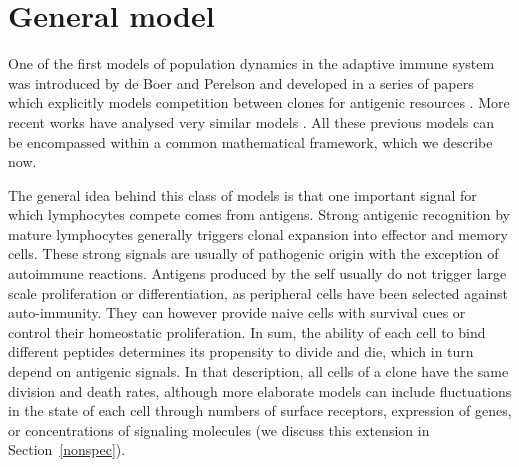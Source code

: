 \documentclass[aps,pre,twocolumn,superscriptaddress,groupedaddress]{revtex4}
\newcommand{\<}{\langle}
\renewcommand{\>}{\rangle}
\begin{document}
 \section{General model}
 \label{genmod}
One of the first models of population dynamics in the adaptive immune system was introduced by de Boer and Perelson and developed in a series of papers which explicitly models competition between clones for antigenic resources \cite{DeBoer1994,DeBoer1995,DeBoer1997,DeBoer2001}.
More recent works have analysed very similar models \cite{Lythe2016,desponds2016}. All these previous models can be encompassed within a common mathematical framework, which we describe now.

The general idea behind this class of models is that one important signal for which lymphocytes compete comes from antigens. Strong antigenic recognition by mature lymphocytes generally triggers clonal expansion into effector and memory cells. These strong signals are usually of pathogenic origin with the exception of autoimmune reactions.
Antigens produced by the self usually do not trigger large scale proliferation or differentiation, as peripheral cells have been selected against auto-immunity. They can however provide naive cells with survival cues or control their homeostatic proliferation.
In sum, the ability of each cell to bind different peptides determines its propensity to divide and die, which in turn depend on antigenic signals. In that description, all cells of a clone have the same division and death rates, although more elaborate models can include fluctuations in the state of each cell through numbers of surface receptors, expression of genes, or concentrations of signaling molecules (we discuss this extension in Section~\ref{nonspec}).
\end{document}
